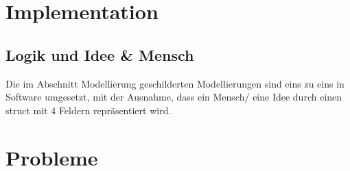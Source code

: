 \section{Implementation}
\subsection{Logik und Idee \& Mensch}
Die im Abschnitt Modellierung geschilderten Modellierungen sind eins zu eins in Software umgesetzt, mit der Ausnahme, dass ein Mensch/ eine Idee durch einen struct mit 4 Feldern repräsentiert wird.

\section{Probleme}

\pagebreak
